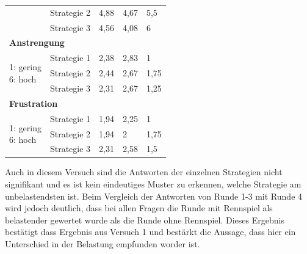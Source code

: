 \documentclass[12pt,a4paper]{scrartcl}
\begin{document}
\begin{longtable}{|p{4cm}|p{2cm}|p{2cm}|p{2cm}|p{2cm}|}
 & Strategie 2 & 4,88 & 4,67 & 5,5 \\
 & Strategie 3 & 4,56 & 4,08 & 6 \\
\hline
		\multicolumn{5}{l}{\textbf{Anstrengung}}\\
		\hline
\multirow{3}{4cm}{1: gering \newline 6: hoch} & Strategie 1 & 2,38 & 2,83 & 1 \\
 & Strategie 2 & 2,44 & 2,67 & 1,75 \\
 & Strategie 3 & 2,31 & 2,67 & 1,25\\
\hline
		\multicolumn{5}{l}{\textbf{Frustration}}\\
		\hline
\multirow{3}{4cm}{1: gering \newline 6: hoch} & Strategie 1 & 1,94 & 2,25 & 1 \\
 & Strategie 2 & 1,94 & 2 & 1,75 \\
 & Strategie 3 & 2,31 & 2,58 & 1,5 \\
\hline
\end{longtable}

Auch in diesem Versuch sind die Antworten der einzelnen Strategien nicht signifikant und es ist kein eindeutiges Muster zu erkennen, welche Strategie am unbelastendsten ist. 
Beim Vergleich der Antworten von Runde 1-3 mit Runde 4 wird jedoch deutlich, dass bei allen Fragen die Runde mit Rennspiel als belastender gewertet wurde als die Runde ohne Rennspiel. Dieses Ergebnis bestätigt dass Ergebnis aus Versuch 1 und bestärkt die Aussage, dass hier ein Unterschied in der Belastung empfunden worder ist.  
\end{document}
